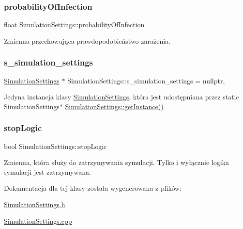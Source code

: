 \subsubsection{\texorpdfstring{probability\+Of\+Infection}{probabilityOfInfection}}
{\footnotesize\ttfamily float Simulation\+Settings\+::probability\+Of\+Infection}

Zmienna przechowująca prawdopodobieństwo zarażenia. \mbox{\label{class_simulation_settings_a725fb3d79c85db8cd446425fac82b50a}} 
\subsubsection{\texorpdfstring{s\+\_\+simulation\+\_\+settings}{s\_simulation\_settings}}
{\footnotesize\ttfamily \mbox{\hyperlink{class_simulation_settings}{Simulation\+Settings}} $\ast$ Simulation\+Settings\+::s\+\_\+simulation\+\_\+settings = nullptr\hspace{0.3cm}{\ttfamily [static]}, {\ttfamily [private]}}

Jedyna instancja klasy \mbox{\hyperlink{class_simulation_settings}{Simulation\+Settings}}, która jest udostępniana przez static Simulation\+Settings$\ast$ \mbox{\hyperlink{class_simulation_settings_ab69bcd8bb611656b17d1f655d09a3004}{Simulation\+Settings\+::get\+Instance()}} \mbox{\label{class_simulation_settings_a5196bd793ff7383a45fe9d4041cc0e97}} 
\subsubsection{\texorpdfstring{stop\+Logic}{stopLogic}}
{\footnotesize\ttfamily bool Simulation\+Settings\+::stop\+Logic}

Zmienna, która służy do zatrzymywania symulacji. Tylko i wyłącznie logika symulacji jest zatrzymywana. 

Dokumentacja dla tej klasy została wygenerowana z plików\+:\begin{DoxyCompactItemize}
\item 
\mbox{\hyperlink{_simulation_settings_8h}{Simulation\+Settings.\+h}}\item 
\mbox{\hyperlink{_simulation_settings_8cpp}{Simulation\+Settings.\+cpp}}\end{DoxyCompactItemize}
